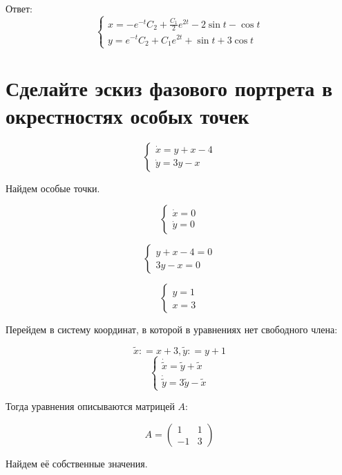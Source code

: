 Ответ:
\[\begin{cases}
        x = -e^{ - t} C_2 + \frac{C_1}{2} e^{2t} - 2\sin t - \cos t \\
        y = e^{ - t} C_2 + C_1 e^{2t} + \sin t + 3\cos t
    \end{cases}\]

\section{}

\section{Сделайте эскиз фазового портрета в окрестностях особых точек}

\[\begin{cases}
        \dot x = y + x - 4 \\
        \dot y = 3y - x
    \end{cases}\]

Найдем особые точки.

\[\begin{cases}
        \dot x = 0 \\
        \dot y = 0
    \end{cases}\]

\[\begin{cases}
        y + x - 4 = 0 \\
        3y - x = 0
    \end{cases}\]

\[\begin{cases}
        y = 1 \\
        x = 3
    \end{cases}\]

Перейдем в систему координат, в которой в уравнениях нет свободного члена:

\[\tilde x : = x + 3, \tilde y : = y + 1\]
\[\begin{cases}
        \dot{\tilde x} = \tilde y + \tilde x \\
        \dot{\tilde y} = 3\tilde y - \tilde x
    \end{cases}\]

Тогда уравнения описываются матрицей \(A\):

\[A = \begin{pmatrix} 1 & 1 \\ - 1 & 3 \end{pmatrix} \]

Найдем её собственные значения.

